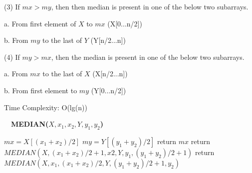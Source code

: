 \documentclass[a4paper,11pt,oneside]{book}
\begin{document}
(3) If $mx > my$, then then median is present in one of the below two subarrays.

a. From first element of $X$ to $mx$ (X[0...n/2])

b. From $my$ to the last of $Y$ (Y[n/2...n])

(4) If $my > mx$, then the median is present in one of the below two subarrays.

a. From $mx$ to the last of $X$ (X[n/2...n])

b. From first element to $my$ (Y[0...n/2])

Time Complexity: O(lg(n))

%
\begin{algorithm*}[h]
\caption{\ \ \textbf{MEDIAN($X, x_1, x_2, Y, y_1, y_2$)}}
\label{selectk}
\begin{algorithmic} [1]
\STATE $mx = X[(x_1 + x_2) / 2]$  
\STATE $my = Y[(y_1 + y_2) / 2]$
    \STATE return $mx$
\ENDIF
{}
    \STATE return $MEDIAN(X, (x_1 + x_2)/2 + 1, x2, Y, y_1, (y_1 + y_2)/2 + 1)$
\ELSE
    \STATE return $MEDIAN(X, x_1, (x_1 + x_2)/2, Y,  (y_1 + y_2)/2 + 1, y_2)$
\ENDIF

\end{algorithmic}
\end{algorithm*}
%
\end{document}
